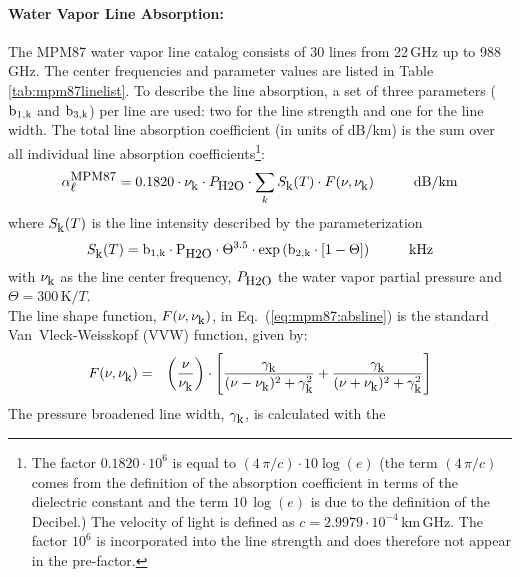 \paragraph{Water Vapor Line Absorption:}
\label{levele:mpm87_h2olines}
The MPM87 \citep{liebeandlayton:87} water vapor line catalog consists 
of 30 lines from 22\,GHz up to 988\,GHz. The center frequencies and parameter 
values are listed in Table \ref{tab:mpm87linelist}. To describe the line 
absorption, a set of three parameters ($\rm b_{\rm 1,k}$ and $\rm b_{\rm 3,k}$) per line are used: two 
for the line strength and one for the line width. The total line 
absorption coefficient (in units of dB/km) is the sum over all 
individual line absorption coefficients\footnote{The factor 
  $0.1820 \cdot 10^{6}$ is equal to $(4\,\pi/c)\cdot 10\log{(e)}$
  (the term $(4\,\pi/c)$ comes from the definition of the absorption
  coefficient in terms of the dielectric constant and the term 
  $10\,\log{(e)}$ is due to the definition of the Decibel.) The
  velocity of light is defined as $c=2.9979\cdot 10^{-4}$\,km\,GHz. 
  The factor $10^{6}$ is incorporated into the line strength and 
  does therefore not appear in the pre-factor.}:
\begin{equation}
  \label{eq:mpm87:absline}
  \alphampmol = 0.1820 \cdot \nuk \cdot \phzo \cdot 
  \sum_{k}{\inten \cdot \shape}\hspace*{10mm}\mbox{dB/km}
\end{equation}
where $S_{\mbox{\rm \small k}}(T)$ is the line intensity described by the parameterization
\begin{equation}
  \label{eq:mpm87:strength}
  \inten = \bek \cdot \phzo \cdot \Theta^{3.5} 
           \cdot \exp{(\bzk \cdot [1-\Theta])}\hspace*{10mm}\mbox{kHz}
\end{equation}
with $\nu_{\mbox{\rm \small k}}$ as the line center frequency, $P_{\mbox{\rm \small H2O}}$ the water
vapor partial pressure and $\Theta = 300\,\mbox{K}/T$.\\
The line shape function, $F(\nu,\nu_{\mbox{\rm \small k}})$, in Eq.~(\ref{eq:mpm87:absline}) 
is the standard Van~Vleck-Weisskopf (VVW) function, given by:
\begin{eqnarray}
  \label{eq:mpm87:VVW}
  F(\nu,\nu_{\mbox{\rm \small k}}) & = & \left(\frac{\nu}{\nu_{\mbox{\rm \small k}}}\right) \cdot 
               \left[\frac{\gamma_{\mbox{\rm \small k}}}{(\nu - \nu_{\mbox{\rm \small k}})^2 + \gamma_{\mbox{\rm \small k}}^2} + 
                     \frac{\gamma_{\mbox{\rm \small k}}}{(\nu + \nu_{\mbox{\rm \small k}})^2 + \gamma_{\mbox{\rm \small k}}^2}\right]\\
\end{eqnarray}
The pressure broadened line width, $\gamma_{\mbox{\rm \small k}}$, is calculated with the 

